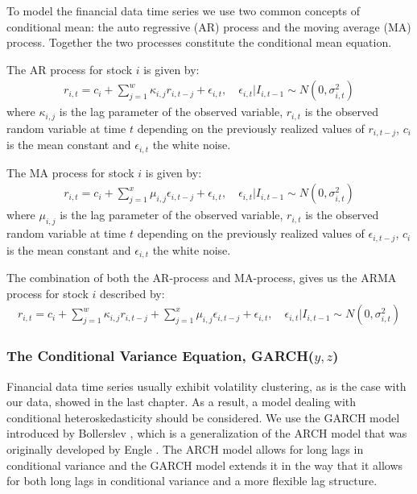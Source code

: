 To model the financial data time series we use two common concepts of conditional mean: the auto regressive (AR) process and the moving average (MA) process. Together the two processes constitute the conditional mean equation. 

The AR process for stock $i$ is given by:
\begin{align}
    r_{i,t}=c_i + \sum_{j=1}^w\kappa_{i,j} r_{i,t-j} + \epsilon_{i,t},\quad \epsilon_{i,t} | I_{i,t-1} \sim N(0,{\sigma_{i,t}^2}) \label{ConditionalMeanEquation}
\end{align}
where $\kappa_{i,j}$ is the lag parameter of the observed variable, $r_{i,t}$ is the observed random variable at time $t$ depending on the previously realized values of $r_{i, t-j}$, $c_i$ is the mean constant and $\epsilon_{i,t}$ the white noise.

The MA process for stock $i$ is given by:
\begin{align}
    r_{i,t}=c_i + \sum_{j=1}^x\mu_{i,j} \epsilon_{i,t-j} + \epsilon_{i,t},\quad \epsilon_{i,t} | I_{i,t-1} \sim N(0,{\sigma_{i,t}^2}) \label{ConditionalMeanEquation}
\end{align}
where $\mu_{i,j}$ is the lag parameter of the observed variable, $r_{i,t}$ is the observed random variable at time $t$ depending on the previously realized values of $\epsilon_{i,t-j}$, $c_i$ is the mean constant and $\epsilon_{i,t}$ the white noise.

The combination of both the AR-process and MA-process, gives us the ARMA process for stock $i$ described by:
\begin{align}
    r_{i,t}=c_i+\sum_{j=1}^w\kappa_{i,j} r_{i,t-j}+\sum_{j=1}^x\mu_{i,j} \epsilon_{i,t-j}+\epsilon_{i,t},\quad \epsilon_{i,t} | I_{i,t-1} \sim N(0,{\sigma_{i,t}^2}) \label{ConditionalMeanEquation}
\end{align}

\subsubsection{The Conditional Variance Equation, GARCH($y,z$)}
Financial data time series usually exhibit volatility clustering, as is the case with our data, showed in the last chapter. As a result, a model dealing with conditional heteroskedasticity should be considered. We use the GARCH model introduced by Bollerslev \cite{Bollerslev}, which is a generalization of the ARCH model that was originally developed by Engle \cite{Engel}. The ARCH model allows for long lags in conditional variance and the GARCH model extends it in the way that it allows for both long lags in conditional variance and a more flexible lag structure.

